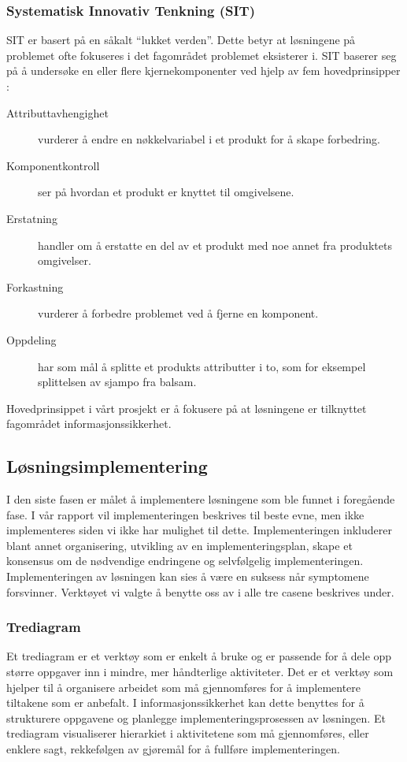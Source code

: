 \subsubsection{Systematisk Innovativ Tenkning (SIT)}
SIT er basert på en såkalt ``lukket verden''. Dette betyr at løsningene på problemet ofte fokuseres i det fagområdet problemet eksisterer i. SIT baserer seg på å undersøke en eller flere kjernekomponenter ved hjelp av fem hovedprinsipper \cite{RCA}: 

\begin{description}
    \item[Attributtavhengighet] vurderer å endre en nøkkelvariabel i et produkt for å skape forbedring.
    \item[Komponentkontroll] ser på hvordan et produkt er knyttet til omgivelsene.
    \item[Erstatning] handler om å erstatte en del av et produkt med noe annet fra produktets omgivelser.
    \item[Forkastning] vurderer å forbedre problemet ved å fjerne en komponent. 
    \item[Oppdeling] har som mål å splitte et produkts attributter i to, som for eksempel splittelsen av sjampo fra balsam.
\end{description}

Hovedprinsippet i vårt prosjekt er å fokusere på at løsningene er tilknyttet fagområdet informasjonssikkerhet.

\subsection{Løsningsimplementering}
I den siste fasen er målet å implementere løsningene som ble funnet i foregående fase. I vår rapport vil implementeringen beskrives til beste evne, men ikke implementeres siden vi ikke har mulighet til dette. Implementeringen inkluderer blant annet organisering, utvikling av en implementeringsplan, skape et konsensus om de nødvendige endringene og selvfølgelig implementeringen. Implementeringen av løsningen kan sies å være en suksess når symptomene forsvinner. Verktøyet vi valgte å benytte oss av i alle tre casene beskrives under. 

\subsubsection{Trediagram}
Et trediagram er et verktøy som er enkelt å bruke og er passende for å dele opp større oppgaver inn i mindre, mer håndterlige aktiviteter. Det er et verktøy som hjelper til å organisere arbeidet som må gjennomføres for å implementere tiltakene som er anbefalt. I informasjonssikkerhet kan dette benyttes for å strukturere oppgavene og planlegge implementeringsprosessen av løsningen. Et trediagram visualiserer hierarkiet i aktivitetene som må gjennomføres, eller enklere sagt, rekkefølgen av gjøremål for å fullføre implementeringen. 

